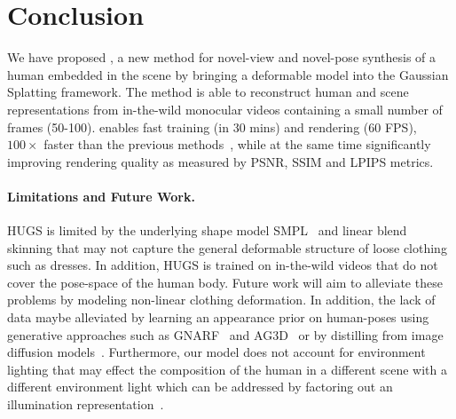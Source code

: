 \section{Conclusion}
We have proposed \acronym, a new method for novel-view and novel-pose synthesis of a human embedded in the scene by bringing a deformable model into the Gaussian Splatting framework. The method is able to reconstruct human and scene representations from in-the-wild monocular videos containing a small number of frames (50-100). \acronym enables fast training (in 30 mins) and rendering (60 FPS), ~ $100\times$ faster than the previous methods~\cite{jiang2022neuman, guo2023vid2avatar}, while at the same time significantly improving rendering quality as measured by PSNR, SSIM and LPIPS metrics.

\paragraph{Limitations and Future Work.} HUGS is limited by the underlying shape model SMPL~\cite{SMPL:2015} and linear blend skinning that may not capture the general deformable structure of loose clothing such as dresses. In addition, HUGS is trained on in-the-wild videos that do not cover the pose-space of the human body. Future work will aim to alleviate these problems by modeling non-linear clothing deformation. In addition, the lack of data maybe alleviated by learning an appearance prior on human-poses using generative approaches such as GNARF~\cite{bergman2022gnarf} and AG3D~\cite{dong2023ag3d} or by distilling from image diffusion models~\cite{poole2022dreamfusion, lin2023magic3d}. Furthermore, our model does not account for environment lighting that may effect the composition of the human in a different scene with a different environment light which can be addressed by factoring out an illumination representation~\cite{verbin2022refnerf, ranjan2023facelit}. 




